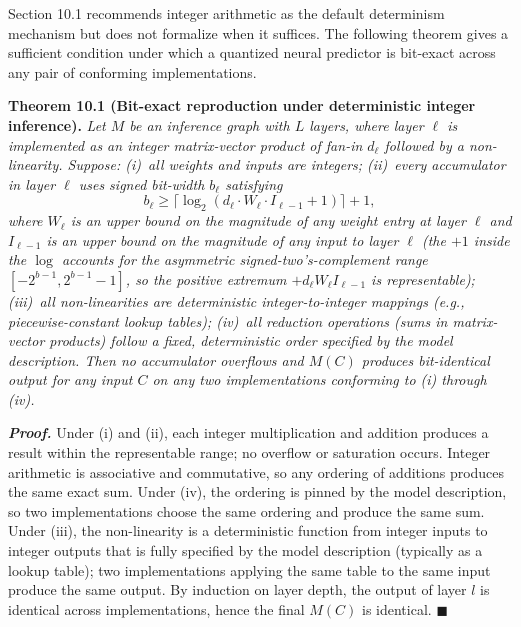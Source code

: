 \documentclass[
]{article}
\begin{document}
Section 10.1 recommends integer arithmetic as the default determinism
mechanism but does not formalize when it suffices. The following theorem
gives a sufficient condition under which a quantized neural predictor is
bit-exact across any pair of conforming implementations.

\textbf{Theorem 10.1 (Bit-exact reproduction under deterministic
integer inference).} \emph{Let $M$ be an inference graph with $L$
layers, where layer $\ell$ is implemented as an integer matrix-vector
product of fan-in $d_\ell$ followed by a non-linearity. Suppose:
(i)~all weights and inputs are integers; (ii)~every accumulator in
layer $\ell$ uses signed bit-width $b_\ell$ satisfying
\[
b_\ell \geq \lceil \log_2(d_\ell \cdot W_\ell \cdot I_{\ell-1} + 1) \rceil + 1,
\]
where $W_\ell$ is an upper bound on the magnitude of any weight entry
at layer $\ell$ and $I_{\ell-1}$ is an upper bound on the magnitude of
any input to layer $\ell$ (the $+1$ inside the $\log$ accounts for
the asymmetric signed-two's-complement range $[-2^{b-1}, 2^{b-1}-1]$,
so the positive extremum $+d_\ell W_\ell I_{\ell-1}$ is representable); (iii)~all non-linearities are deterministic
integer-to-integer mappings (e.g., piecewise-constant lookup tables);
(iv)~all reduction operations (sums in matrix-vector products) follow
a fixed, deterministic order specified by the model description. Then
no accumulator overflows and $M(C)$ produces bit-identical output for
any input $C$ on any two implementations conforming to (i) through
(iv).}

\emph{\textbf{Proof.}} Under (i) and (ii), each integer multiplication
and addition produces a result within the representable range; no
overflow or saturation occurs. Integer arithmetic is associative and
commutative, so any ordering of additions produces the same exact sum.
Under (iv), the ordering is pinned by the model description, so two
implementations choose the same ordering and produce the same sum.
Under (iii), the non-linearity is a deterministic function from
integer inputs to integer outputs that is fully specified by the model
description (typically as a lookup table); two implementations
applying the same table to the same input produce the same output. By
induction on layer depth, the output of layer $l$ is identical across
implementations, hence the final $M(C)$ is identical.
\hfill$\blacksquare$
\end{document}
